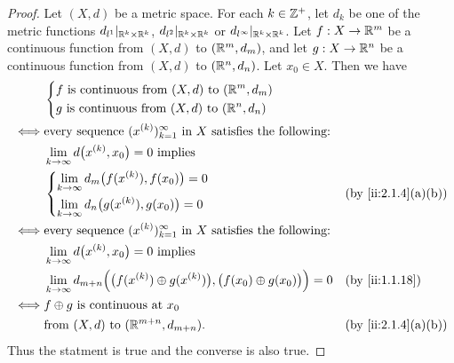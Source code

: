 \begin{proof}
  Let \((X, d)\) be a metric space.
  For each \(k \in \mathbb{Z}^+\), let \(d_k\) be one of the metric functions \(d_{l^1}|_{\mathbb{R}^k \times \mathbb{R}^k}\), \(d_{l^2}|_{\mathbb{R}^k \times \mathbb{R}^k}\) or \(d_{l^\infty}|_{\mathbb{R}^k \times \mathbb{R}^k}\).
  Let \(f : X \to \mathbb{R}^m\) be a continuous function from \((X, d)\) to \((\mathbb{R}^m, d_m)\), and let \(g : X \to \mathbb{R}^n\) be a continuous function from \((X, d)\) to \((\mathbb{R}^n, d_n)\).
  Let \(x_0 \in X\).
  Then we have
  \begin{align*}
         & \begin{dcases}
             f \text{ is continuous from } (X, d) \text{ to } (\R^m, d_m) \\
             g \text{ is continuous from } (X, d) \text{ to } (\R^n, d_n)
           \end{dcases}                                                                              \\
    \iff & \text{every sequence } (x^{(k)})_{k = 1}^\infty \text{ in } X \text{ satisfies the following:}                                            \\
         & \lim_{k \to \infty} d\big(x^{(k)}, x_0\big) = 0 \text{ implies }                                                                          \\
         & \begin{dcases}
             \lim_{k \to \infty} d_m\big(f(x^{(k)}), f(x_0)\big) = 0 \\
             \lim_{k \to \infty} d_n\big(g(x^{(k)}), g(x_0)\big) = 0
           \end{dcases}                                                        &  & \by{ii:2.1.4}[a,b]                                               \\
    \iff & \text{every sequence } (x^{(k)})_{k = 1}^\infty \text{ in } X \text{ satisfies the following:}                                            \\
         & \lim_{k \to \infty} d\big(x^{(k)}, x_0\big) = 0 \text{ implies }                                                                          \\
         & \lim_{k \to \infty} d_{m + n}\Big(\big(f(x^{(k)}) \oplus g(x^{(k)})\big), \big(f(x_0) \oplus g(x_0)\big)\Big) = 0 &  & \by{ii:1.1.18}     \\
    \iff & f \oplus g \text{ is continuous at } x_0                                                                                                  \\
         & \text{from } (X, d) \text{ to } (\R^{m + n}, d_{m + n}).                                                          &  & \by{ii:2.1.4}[a,b]
  \end{align*}
  Thus the statment is true and the converse is also true.
\end{proof}

